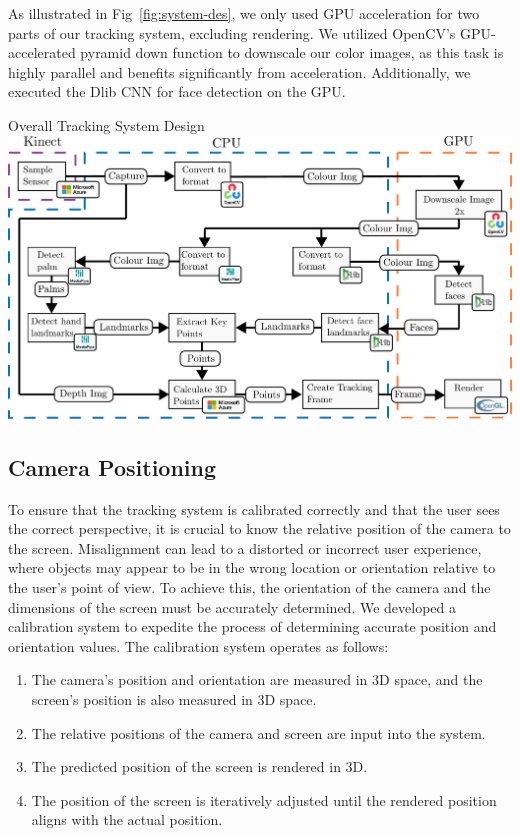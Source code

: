 As illustrated in Fig~\ref{fig:system-des}, we only used GPU acceleration for two parts of our tracking system, excluding rendering. We utilized OpenCV's GPU-accelerated pyramid down function to downscale our color images, as this task is highly parallel and benefits significantly from acceleration. Additionally, we executed the Dlib CNN for face detection on the GPU.

\begin{figureBox}[label={fig:system-des}, width=1.0\linewidth]{Overall Tracking System Design}
    \includegraphics[width=1.0\linewidth]{./implementation/figures/tracking-system.pdf}
\end{figureBox}


\subsection{Camera Positioning}

To ensure that the tracking system is calibrated correctly and that the user sees the correct perspective, it is crucial to know the relative position of the camera to the screen. Misalignment can lead to a distorted or incorrect user experience, where objects may appear to be in the wrong location or orientation relative to the user's point of view. To achieve this, the orientation of the camera and the dimensions of the screen must be accurately determined. We developed a calibration system to expedite the process of determining accurate position and orientation values. The calibration system operates as follows:

\begin{enumerate}[itemsep=-0.25em]
    \item The camera's position and orientation are measured in 3D space, and the screen's position is also measured in 3D space.
    \item The relative positions of the camera and screen are input into the system.
    \item The predicted position of the screen is rendered in 3D.
    \item The position of the screen is iteratively adjusted until the rendered position aligns with the actual position.
\end{enumerate}

